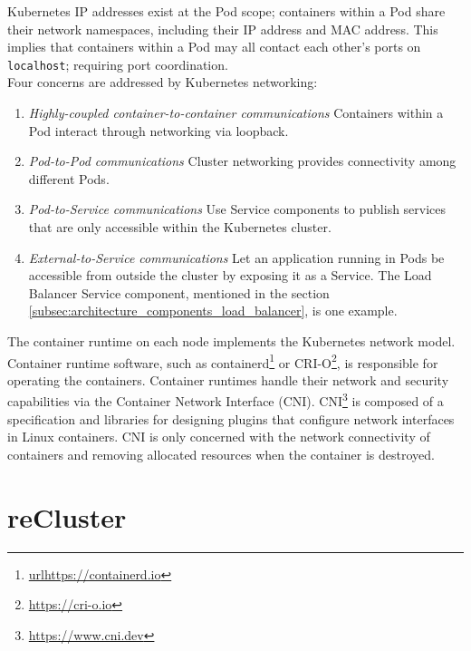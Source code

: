 Kubernetes IP addresses exist at the Pod scope; containers within a Pod share
their network namespaces, including their IP address and MAC address. This
implies that containers within a Pod may all contact each other's ports on
\texttt{localhost}; requiring port coordination. \\ %
Four concerns are addressed by Kubernetes networking:
\begin{enumerate}
  \item \textit{Highly-coupled container-to-container communications}
    \newline
    Containers within a Pod interact through networking via loopback.

  \item \textit{Pod-to-Pod communications}
    \newline
    Cluster networking provides connectivity among different Pods.

  \item \textit{Pod-to-Service communications}
    \newline
    Use Service components to publish services that are only accessible within
    the Kubernetes cluster.

  \item \textit{External-to-Service communications}
    \newline
    Let an application running in Pods be accessible from outside the cluster by
    exposing it as a Service. The Load Balancer Service component, mentioned in
    the section \ref{subsec:architecture_components_load_balancer}, is one example.
\end{enumerate}
The container runtime on each node implements the Kubernetes network model.
Container runtime software, such as containerd\footnote{\url{urlhttps://containerd.io}}
or CRI-O\footnote{\url{https://cri-o.io}}, is responsible for operating the
containers. Container runtimes handle their network and security capabilities via
the Container Network Interface (CNI). CNI\footnote{\url{https://www.cni.dev}}
is composed of a specification and libraries for designing plugins that
configure network interfaces in Linux containers. CNI is only concerned with the
network connectivity of containers and removing allocated resources when the container
is destroyed.

\section{reCluster}
\label{sec:architecture_recluster}

